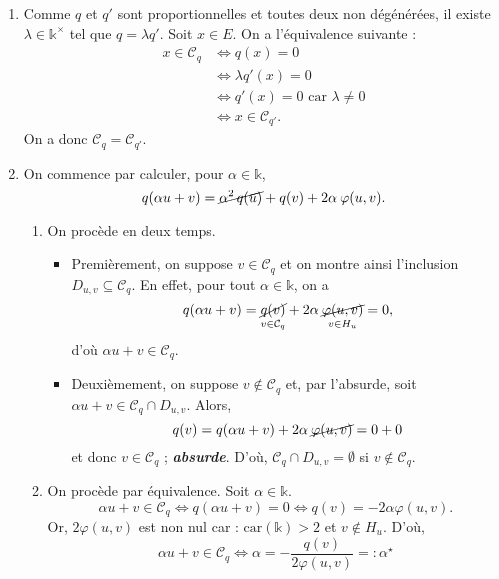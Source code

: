 \documentclass{../../td}
\begin{document}
  \begin{enumerate}
    \item Comme $q$ et $q'$ sont proportionnelles et toutes deux non dégénérées, il existe $\lambda \in \mathds{k}^\times$ tel que $q = \lambda q'$.
      Soit $x \in E$. On a l'équivalence suivante :
      \begin{align*}
        x \in \mathcal{C}_q &\iff q(x) = 0\\
        &\iff \lambda q'(x) = 0\\
        &\iff q'(x) = 0 \text{ car } \lambda \neq 0\\
        &\iff x \in \mathcal{C}_{q'}
      .\end{align*}
      On a donc $\mathcal{C}_q = \mathcal{C}_{q'}$.
    \item On commence par calculer, pour $\alpha \in \mathds{k}$, \[
        q(\alpha u + v) = \cancel{\alpha^2\, q(u)} + q(v) + 2 \alpha\:\varphi(u,v)
      .\] \label{ex2-q2}
      \begin{enumerate}
        \item On procède en deux temps. 
          \begin{itemize}
            \item Premièrement, on suppose $v \in \mathcal{C}_q$ et on montre ainsi l'inclusion $D_{u,v} \subseteq \mathcal{C}_q$.
              En effet, pour tout $\alpha \in \mathds{k}$, on a \[
                q(\alpha u+ v) = \underset{v \in \mathcal{C}_q}{\cancel{q(v)}} + 2 \alpha\:\underset{v \in H_u}{\cancel{\varphi(u,v)}} = 0
              ,\] d'où $\alpha u + v \in \mathcal{C}_q$.
            \item Deuxièmement, on suppose $v \not\in \mathcal{C}_q$ et, par l'absurde, soit $\alpha u + v \in \mathcal{C}_q \cap D_{u,v}$.
              Alors, \[
                q(v) = q(\alpha u + v) + 2 \alpha\: \cancel{\varphi(u,v)} = 0 + 0
              \] et donc $v \in \mathcal{C}_q$ ; \textit{\textbf{absurde}}.
              D'où, $\mathcal{C}_q \cap D_{u,v} = \emptyset$ si $v \not\in \mathcal{C}_q$.
          \end{itemize}
        \item \label{ex2-q2b} On procède par équivalence. Soit $\alpha \in \mathds{k}$.
          \[
          \alpha u + v \in \mathcal{C}_q \iff q(\alpha u + v) = 0 \iff q(v) = -2 \alpha \varphi(u,v)
          .\] 
          Or, $2\varphi(u,v)$ est non nul car : $\mathrm{car}(\mathds{k}) > 2$ et $v \not\in H_u$.
          D'où,  \[
          \alpha u + v \in \mathcal{C}_q \iff \alpha = - \frac{q(v)}{2 \varphi(u,v)} =: \alpha^\star
\]
\end{enumerate}
\end{enumerate}
\end{document}
